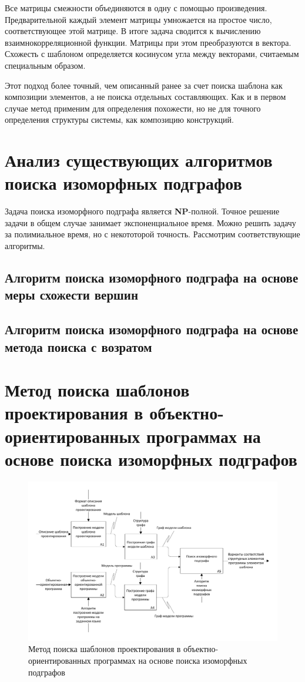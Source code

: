 Все матрицы смежности объединяются в одну с помощью произведения.
Предварительной каждый элемент матрицы умножается на простое число,
соответствующее этой матрице.
В итоге задача сводится к вычислению взаимнокорреляционной функции.
Матрицы при этом преобразуются в вектора.
Схожесть с шаблоном определяется косинусом угла между векторами,
считаемым специальным образом.

Этот подход более точный, чем описанный ранее за счет поиска шаблона как композиции
элементов, а не поиска отдельных составляющих.
Как и в первом случае метод применим для определения похожести,
но не для точного определения структуры системы, как композицию конструкций.

\section{Анализ существующих алгоритмов поиска изоморфных подграфов}

Задача поиска изоморфного подграфа является \textbf{NP}-полной.
Точное решение задачи в общем случае занимает экспоненциальное время.
Можно решить задачу за полимиальное время, но с некототорой точность.
Рассмотрим соответствующие алгоритмы.

\subsection{Алгоритм поиска изоморфного подграфа на основе меры схожести вершин}

\cite{SimilarityGraphVertices}

\subsection{Алгоритм поиска изоморфного подграфа на основе метода поиска с возратом}

\cite{SubgraphIsomorphism}

\section{Метод поиска шаблонов проектирования в объектно-ориентированных программах на основе поиска изоморфных подграфов}

\begin{figure}
\centering
\includegraphics[width=\textwidth]{inc/idef0-specific.pdf}
\caption{Метод поиска шаблонов проектирования в объектно-ориентированных программах на основе поиска изоморфных подграфов}
\label{fig:idef0-specific}
\end{figure}
